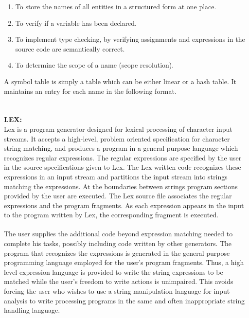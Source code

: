 \documentclass[10pt,a4paper]{article}
\begin{document}
\begin{enumerate}
\item To store the names of all entities in a structured form at one place.
\item To verify if a variable has been declared.
\item To implement type checking, by verifying assignments and expressions in the source code are semantically correct.
\item To determine the scope of a name (scope resolution).
\end{enumerate}
A symbol table is simply a table which can be either linear or a hash table. It maintains an entry for each name in the following format.
\\<symbol name,  type,  attribute>
\\\\
\textbf{LEX:}
\\Lex is a program generator designed for lexical processing of character input streams. It accepts a high-level, problem oriented specification for character string matching, and produces a program in a general purpose language which recognizes regular expressions. The regular expressions are specified by the user in the source specifications given to Lex. The Lex written code recognizes these expressions in an input stream and partitions the input stream into strings matching the expressions. At the boundaries between strings program sections provided by the user are executed. The Lex source file associates the regular expressions and the program fragments. As each expression appears in the input to the program written by Lex, the corresponding fragment is executed. 
\\\\The user supplies the additional code beyond expression matching needed to complete his tasks, possibly including code written by other generators. The program that recognizes the expressions is generated in the general purpose programming language employed for the user's program fragments. Thus, a high level expression language is provided to write the string expressions to be matched while the user's freedom to write actions is unimpaired. This avoids forcing the user who wishes to use a string manipulation language for input analysis to write processing programs in the same and often inappropriate string handling language. 
\end{document}
